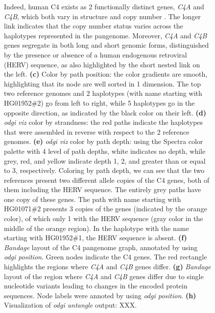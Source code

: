 \begin{figure}[!htb]
{        Indeed, human C4 exists as 2 functionally distinct genes, \textit{C4A} and \textit{C4B}, which both vary in structure and copy number \citep{Sekar_2016}. The longer link indicates that the copy number status varies across the haplotypes represented in the pangenome.
        Moreover, \textit{C4A} and \textit{C4B} genes segregate in both long and short genomic forms, distinguished by the presence or absence of a human endogenous retroviral (HERV) sequence, as also highlighted by the short nested link on the left.
        \textbf{(c)} Color by path position: the color gradients are smooth, highlighting that its node are well sorted in 1 dimension.
        The top two reference genomes and 2 haplotypes (with name starting with HG01952\#2) go from left to right, while 5 haplotypes go in the opposite direction, as indicated by the black color on their left.
        \textbf{(d)} \textit{odgi viz} color by strandness: the red paths indicate the haplotypes that were assembled in reverse with respect to the 2 reference genomes.
        \textbf{(e)} \textit{odgi viz} color by path depth: using the Spectra color palette with 4 level of path depths, white indicates no depth, while grey, red, and yellow indicate depth 1, 2, and greater than or equal to 3, respectively.
        Coloring by path depth, we can see that the two references present two different allele copies of the C4 genes, both of them including the HERV sequence.
        The entirely grey paths have one copy of these genes.
        The path with name starting with HG01071\#2 presents 3 copies of the genes (indicated by the orange color), of which only 1 with the HERV sequence (gray color in the middle of the orange region).
        In the haplotype with the name starting with HG01952\#1, the HERV sequence is absent.
        \textbf{(f)} \textit{Bandage} layout of the C4 pangenome graph, annotated by using \textit{odgi position}. Green nodes indicate the C4 genes. The red rectangle highlights the regions where \textit{C4A} and \textit{C4B} genes differ.
        \textbf{(g)} \textit{Bandage} layout of the region where \textit{C4A} and \textit{C4B} genes differ due to single nucleotide variants leading to changes in the encoded protein sequences. Node labels were annoted by using \textit{odgi position}.
        \textbf{(h)} Visualization of \textit{odgi untangle} output: XXX.
    }
    \label{fig:odgi_viz}
\end{figure}


